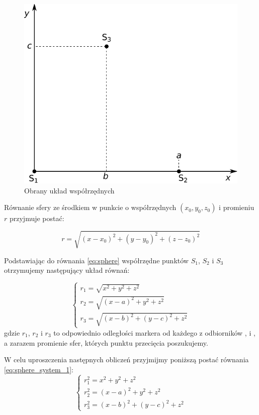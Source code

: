 \begin{figure}
  \includegraphics[width=\textwidth]{gfx/diagramy/schemat_uklad_wspolrzednych_clipped}
  \caption{Obrany układ współrzędnych}
  \label{fig:schema_coordinates}
\end{figure}

Równanie sfery ze środkiem w punkcie o współrzędnych $(x_0, y_0, z_0)$ i promieniu $r$ przyjmuje postać:

\begin{equation}
 r = \sqrt{(x - x_0)^2 + (y - y_0)^2 + (z - z_0)^2}
 \label{eq:sphere}
\end{equation}

Podstawiając do równania \ref{eq:sphere} współrzędne punktów $S_1$, $S_2$ i $S_3$ otrzymujemy następujący układ równań:

\begin{equation}
 \begin{cases}
  r_1 = \sqrt{x^2 + y^2 + z^2} \\
  r_2 = \sqrt{(x - a)^2 + y^2 + z^2} \\
  r_3 = \sqrt{(x - b)^2 + (y - c)^2 + z^2}
 \end{cases}
 \label{eq:sphere_system_1}
\end{equation}
gdzie $r_1$, $r_2$ i $r_3$ to odpowiednio odległości markera od każdego z odbiorników ,  i , a zarazem promienie sfer, których punktu przecięcia poszukujemy.

W celu uproszczenia następnych obliczeń przyjmijmy poniższą postać równania \ref{eq:sphere_system_1}:
\begin{equation}
 \begin{cases}
  r_1^2 = x^2 + y^2 + z^2 \\
  r_2^2 = (x - a)^2 + y^2 + z^2 \\
  r_3^2 = (x - b)^2 + (y - c)^2 + z^2
 \end{cases}
 \label{eq:sphere_system_2}
\end{equation}

